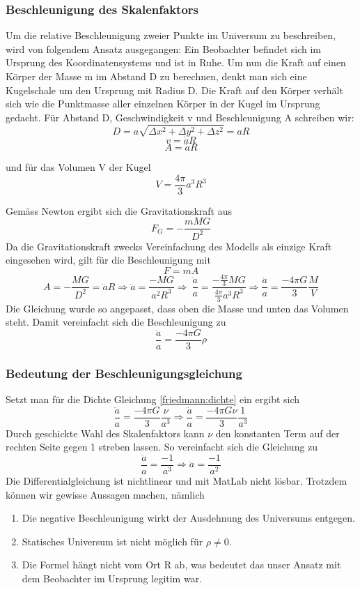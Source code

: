 \begin{refsection}
\subsubsection{Beschleunigung des Skalenfaktors}
Um die relative Beschleunigung zweier Punkte im Universum zu beschreiben, wird von folgendem Ansatz ausgegangen: Ein Beobachter befindet sich im Ursprung des Koordinatensystems und ist in Ruhe. Um nun die Kraft auf einen Körper der Masse m im Abstand D zu berechnen, denkt man sich eine Kugelschale um den Ursprung mit Radius D. Die Kraft auf den Körper verhält sich wie die Punktmasse aller  einzelnen Körper in der Kugel im Ursprung gedacht.
Für Abstand D, Geschwindigkeit v und Beschleunigung A schreiben wir:
\[D =  a \sqrt{\Delta x^2 + \Delta y^2 + \Delta z^2}  = a R\]
\[v = \dot{a} R\]
\[A = \ddot{a} R\]

und für das Volumen V der Kugel
\[V = \frac{4 \pi }{3} a^3 R^3\]

Gemäss Newton ergibt sich die Gravitationskraft aus
\begin{equation}
F_G = -\frac{m M G}{D^2}
\end{equation}
Da die Gravitationskraft zwecks Vereinfachung des Modells als einzige Kraft eingesehen wird, gilt für die Beschleunigung mit 
\[F = m A\]
\[A = - \frac{M G}{D^2} = \ddot{a} R \Rightarrow \ddot{a} = \frac{- M G}{a^2 R^3} \Rightarrow\ \frac{\ddot{a}}{a} = \frac{-\frac{4 \pi }{3} M G}{\frac{4 \pi}{3}a^3 R^3} \Rightarrow \frac{\ddot{a}}{a} = \frac{- 4 \pi G}{3} \frac{M}{V}\]
Die Gleichung wurde so angepasst, dass oben die Masse und unten das Volumen steht. Damit vereinfacht sich die Beschleunigung zu
\begin{equation}
\frac{\ddot{a}}{a} = \frac{- 4 \pi G}{3} \rho
\end{equation}
\subsubsection{Bedeutung der Beschleunigungsgleichung}
Setzt man für die Dichte Gleichung \ref{friedmann:dichte} ein ergibt sich
\[\frac{\ddot{a}}{a} = \frac{- 4 \pi G}{3} \frac{\nu}{a^3} \Rightarrow \frac{\ddot{a}}{a} = \frac{- 4 \pi G \nu}{3} \frac{1}{a^3}\]
Durch geschickte Wahl des Skalenfaktors kann $\nu$ den konstanten Term auf der rechten Seite gegen 1 streben lassen. So vereinfacht sich die Gleichung zu
\[\frac{\ddot{a}}{a} = \frac{-1}{a^3} \Rightarrow \ddot{a} = \frac{-1}{a^2}\]
Die Differentialgleichung ist nichtlinear und mit MatLab nicht lösbar. Trotzdem können wir gewisse Aussagen machen, nämlich
\begin{enumerate}
	\item Die negative Beschleunigung wirkt der Ausdehnung des Universums entgegen. 
	\item Statisches Universum ist nicht möglich für $\rho \neq 0$.
	\item Die Formel hängt nicht vom Ort R ab, was bedeutet das unser Ansatz mit dem Beobachter im Ursprung legitim war.
\end{enumerate}


\end{refsection}

